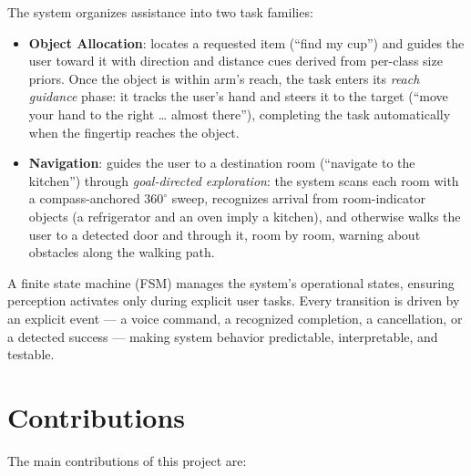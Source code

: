 The system organizes assistance into two task families:

\begin{itemize}
    \item \textbf{Object Allocation}: locates a requested item (``find my cup'') and
          guides the user toward it with direction and distance cues derived from
          per-class size priors. Once the object is within arm's reach, the task
          enters its \emph{reach guidance} phase: it tracks the user's hand and
          steers it to the target (``move your hand to the right \ldots{} almost
          there''), completing the task automatically when the fingertip reaches
          the object.
    \item \textbf{Navigation}: guides the user to a destination room
          (``navigate to the kitchen'') through \emph{goal-directed exploration}:
          the system scans each room with a compass-anchored $360^\circ$ sweep,
          recognizes arrival from room-indicator objects (a refrigerator and an oven
          imply a kitchen), and otherwise walks the user to a detected door and
          through it, room by room, warning about obstacles along the walking path.
\end{itemize}

A finite state machine (FSM) manages the system's operational states, ensuring
perception activates only during explicit user tasks. Every transition is driven by
an explicit event --- a voice command, a recognized completion, a cancellation, or a
detected success --- making system behavior predictable, interpretable, and testable.

\section{Contributions}
\label{sec:contributions}

The main contributions of this project are:

